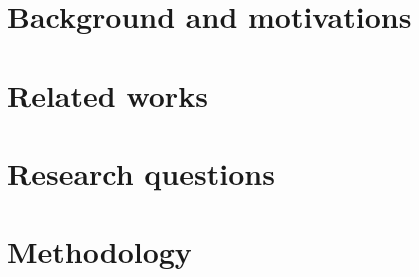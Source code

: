 \documentclass{Configuration_Files/PoliMi3i_thesis}
\begin{document}

\thispagestyle{empty}
\tableofcontents %
\thispagestyle{empty}
\cleardoublepage

%
%
%    
%

\mainmatter %

\chapter{Background and motivations}\label{ch:background}


\chapter{Related works}\label{ch:related_works}


\chapter{Research questions}\label{ch:research_questions}


\chapter{Methodology}\label{ch:methodology}

\end{document}
